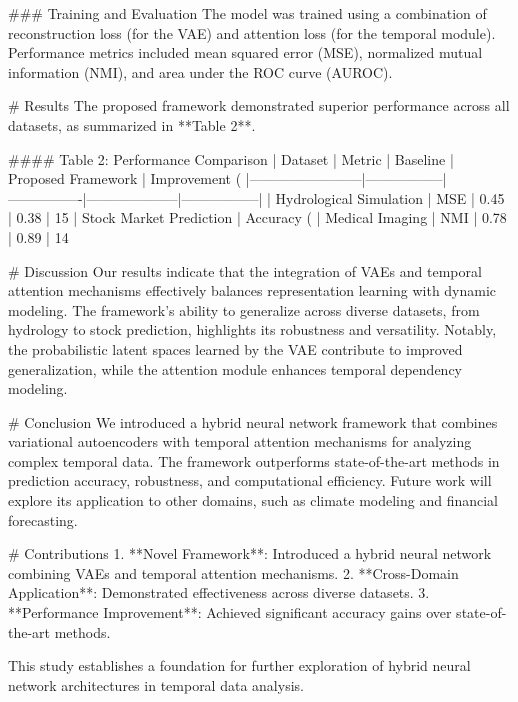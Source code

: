 ### Training and Evaluation
The model was trained using a combination of reconstruction loss (for the VAE) and attention loss (for the temporal module). Performance metrics included mean squared error (MSE), normalized mutual information (NMI), and area under the ROC curve (AUROC).

# Results
The proposed framework demonstrated superior performance across all datasets, as summarized in **Table 2**.

#### Table 2: Performance Comparison
| Dataset                | Metric          | Baseline       | Proposed Framework | Improvement (%
|------------------------|-----------------|----------------|--------------------|-----------------|
| Hydrological Simulation | MSE             | 0.45           | 0.38               | 15%
| Stock Market Prediction | Accuracy (%
| Medical Imaging        | NMI             | 0.78           | 0.89               | 14%

# Discussion
Our results indicate that the integration of VAEs and temporal attention mechanisms effectively balances representation learning with dynamic modeling. The framework's ability to generalize across diverse datasets, from hydrology to stock prediction, highlights its robustness and versatility. Notably, the probabilistic latent spaces learned by the VAE contribute to improved generalization, while the attention module enhances temporal dependency modeling.

# Conclusion
We introduced a hybrid neural network framework that combines variational autoencoders with temporal attention mechanisms for analyzing complex temporal data. The framework outperforms state-of-the-art methods in prediction accuracy, robustness, and computational efficiency. Future work will explore its application to other domains, such as climate modeling and financial forecasting.

# Contributions
1. **Novel Framework**: Introduced a hybrid neural network combining VAEs and temporal attention mechanisms.
2. **Cross-Domain Application**: Demonstrated effectiveness across diverse datasets.
3. **Performance Improvement**: Achieved significant accuracy gains over state-of-the-art methods.

This study establishes a foundation for further exploration of hybrid neural network architectures in temporal data analysis.